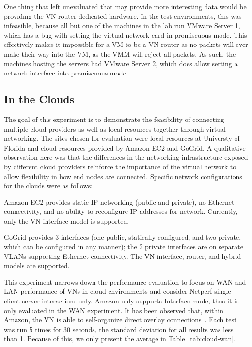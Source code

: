 One thing that left unevaluated that may provide more interesting data would
be providing the VN router dedicated hardware.  In the test environments, this
was infeasible, because all but one of the machines in the lab run VMware
Server 1, which has a bug with setting the virtual network card in promiscuous
mode.  This effectively makes it impossible for a VM to be a VN router as no
packets will ever make their way into the VM, as the VMM will reject all
packets.  As such, the machines hosting the servers had VMware Server 2, which
does allow setting a network interface into promiscuous mode.

\subsection{In the Clouds}
The goal of this experiment is to demonstrate the feasibility of connecting
multiple cloud providers as well as local resources together through virtual
networking.  The sites chosen for evaluation were local resources at Universty
of Florida and cloud resources provided by Amazon EC2 and GoGrid.  A
qualitative observation here was that the differences in the networking
infrastructure exposed by different cloud providers reinforce the importance
of the virtual network to allow flexibility in how end nodes are connected.
Specific network configurations for the clouds were as follows:
\begin{itemize}
\small{
\setlength{\itemsep}{0pt}
\setlength{\parskip}{0pt}
\item Amazon EC2 provides static IP networking (public and private), no
Ethernet connectivity, and no ability to reconfigure IP addresses for
network. Currently, only the VN interface model is supported.
\item GoGrid provides 3 interfaces (one public, statically configured,
and two private, which can be configured in any manner); the 2 private
interfaces are on separate VLANs supporting Ethernet connectivity. The
VN interface, router, and hybrid models are supported.
}
\end{itemize}

This experiment narrows down the performance evaluation to focus on WAN and LAN
performance of VNs in cloud environments and consider Netperf single
client-server interactions only. Amazon only supports Interface mode, thus it
is only evaluated in the WAN experiment. It has been observed that, within
Amazon, the VN is able to self-organize direct overlay connections~\cite{wow}.
Each test was run 5 times for 30 seconds, the standard deviation for all
results was less than 1.  Because of this, we only present the average in
Table~\ref{tab:cloud-wan}.

